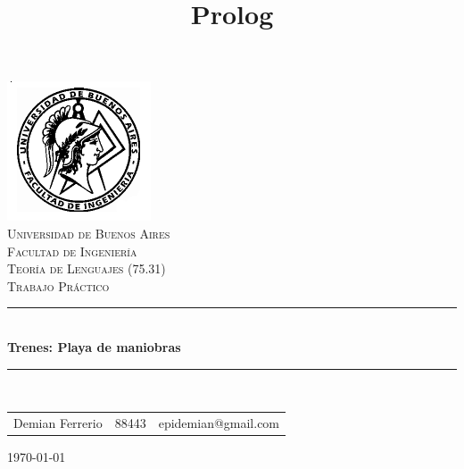 \documentclass[12pt,titlepage]{article}
\begin{document}


\pagestyle{fancy}
\renewcommand{\sectionmark}[1]{\markboth{}{\thesection\ \ #1}}
\lhead{}
\chead{}
\rhead{\rightmark}
\lfoot{}
\cfoot{}
\rfoot{\thepage}



\title{Prolog}
\author{}



\begin{titlepage}

\thispagestyle{empty}

\begin{center}
\includegraphics[scale=0.55]{./fiuba}\\
\textsc{\Large Universidad de Buenos Aires}\\[0.2cm]
\textsc{\Large Facultad de Ingeniería}\\[1.5cm]


\textsc{\large Teoría de Lenguajes (75.31)} \\[0.3cm]
\textsc{\large Trabajo Práctico} \\[0.5cm]

\rule{\linewidth}{0.5mm} \\[0.4cm]
{\huge \bfseries Trenes: Playa de maniobras} \\
\rule{\linewidth}{0.5mm} \\[1cm]

\vfill

\Large 
\begin{tabular}{lll}
Demian Ferrerio & 88443 & epidemian@gmail.com \\[0.5cm]
\end{tabular}

{\Large \today}

\end{center}
\end{titlepage}
\end{document}
